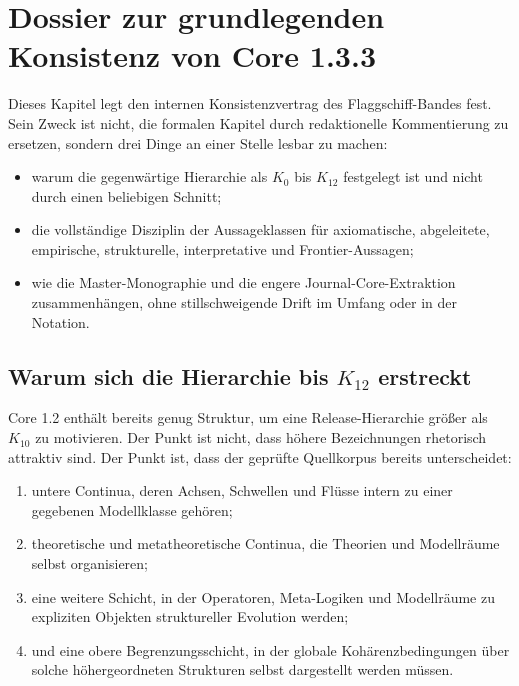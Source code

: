 \section{Dossier zur grundlegenden Konsistenz von Core 1.3.3}
\label{sec:oc13-foundational-consistency}

Dieses Kapitel legt den internen Konsistenzvertrag des Flaggschiff-Bandes fest.
Sein Zweck ist nicht, die formalen Kapitel durch redaktionelle Kommentierung zu
ersetzen, sondern drei Dinge an einer Stelle lesbar zu machen:

\begin{itemize}
\item warum die gegenwärtige Hierarchie als \(K_0\) bis \(K_{12}\) festgelegt
      ist und nicht durch einen beliebigen Schnitt;
\item die vollständige Disziplin der Aussageklassen für axiomatische,
      abgeleitete, empirische, strukturelle, interpretative und Frontier-Aussagen;
\item wie die Master-Monographie und die engere Journal-Core-Extraktion
      zusammenhängen, ohne stillschweigende Drift im Umfang oder in der Notation.
\end{itemize}

\subsection{Warum sich die Hierarchie bis \texorpdfstring{$K_{12}$}{K12} erstreckt}

Core 1.2 enthält bereits genug Struktur, um eine Release-Hierarchie größer als
\(K_{10}\) zu motivieren. Der Punkt ist nicht, dass höhere Bezeichnungen
rhetorisch attraktiv sind. Der Punkt ist, dass der geprüfte Quellkorpus bereits
unterscheidet:

\begin{enumerate}
\item untere Continua, deren Achsen, Schwellen und Flüsse intern zu einer
      gegebenen Modellklasse gehören;
\item theoretische und metatheoretische Continua, die Theorien und
      Modellräume selbst organisieren;
\item eine weitere Schicht, in der Operatoren, Meta-Logiken und Modellräume
      zu expliziten Objekten struktureller Evolution werden;
\item und eine obere Begrenzungsschicht, in der globale Kohärenzbedingungen
      über solche höhergeordneten Strukturen selbst dargestellt werden müssen.
\end{enumerate}

